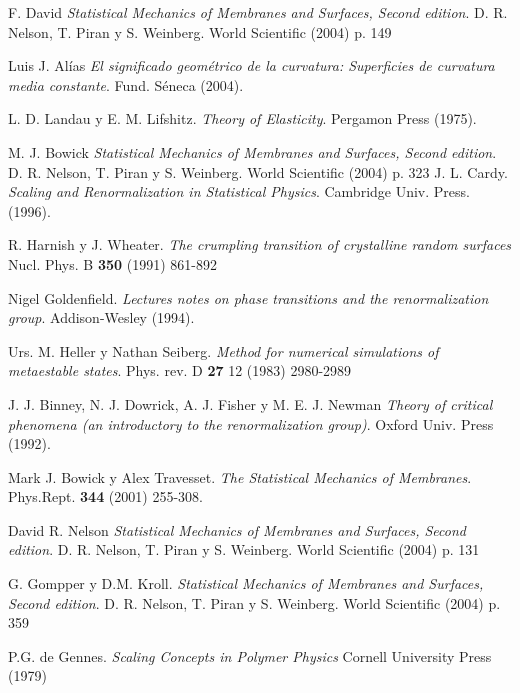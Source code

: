 \begin{thebibliography}{99}
F. David
  \textit{Statistical Mechanics of Membranes and Surfaces, Second edition}.
  D. R. Nelson, T. Piran y S. Weinberg.
  World Scientific (2004) p. 149


Luis J. Alías
  \textit{El significado geométrico de la curvatura: Superficies de curvatura
    media constante}.
  Fund. Séneca (2004).

L. D. Landau y E. M. Lifshitz.
  \textit{Theory of Elasticity}.
  Pergamon Press (1975).

M. J. Bowick
  \textit{Statistical Mechanics of Membranes and Surfaces, Second edition}.
  D. R. Nelson, T. Piran y S. Weinberg.
  World Scientific (2004) p. 323
 J. L. Cardy.
  \textit{Scaling and Renormalization in Statistical Physics}.
  Cambridge Univ. Press. (1996).

R. Harnish y J. Wheater.
  \textit{The crumpling transition of crystalline random surfaces}
Nucl. Phys. B \textbf{350} (1991) 861-892

Nigel Goldenfield. 
  \textit{Lectures notes on phase transitions and the renormalization group}.
  Addison-Wesley (1994).

Urs. M. Heller y Nathan Seiberg.
\textit{Method for numerical simulations of metaestable states}.
Phys. rev. D \textbf{27} 12 (1983) 2980-2989

J. J. Binney, N. J. Dowrick, A. J. Fisher y
  M. E. J. Newman 
  \textit{Theory of critical phenomena (an introductory to the renormalization
    group)}.
  Oxford Univ. Press  (1992).

Mark J. Bowick y Alex Travesset.
\textit{The Statistical Mechanics of Membranes}.
Phys.Rept. \textbf{344} (2001) 255-308.

 David R. Nelson
  \textit{Statistical Mechanics of Membranes and Surfaces, Second edition}.
  D. R. Nelson, T. Piran y S. Weinberg.
  World Scientific (2004) p. 131

G. Gompper y D.M. Kroll.
  \textit{Statistical Mechanics of Membranes and Surfaces, Second edition}.
  D. R. Nelson, T. Piran y S. Weinberg.
  World Scientific (2004) p. 359

 P.G. de Gennes.
   \textit{Scaling Concepts in Polymer Physics}
   Cornell University Press (1979)


\end{thebibliography}
